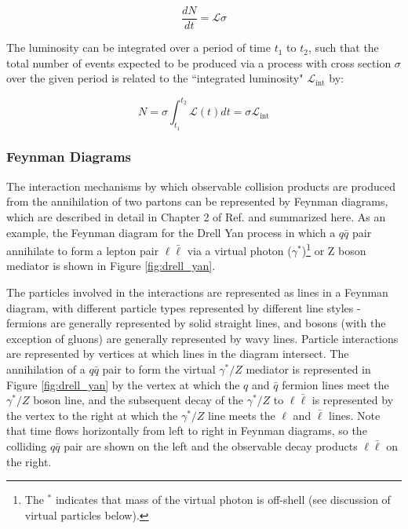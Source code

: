 \begin{equation}
\frac{dN}{dt} = \mathcal{L}\sigma
\end{equation}

The luminosity can be integrated over a period of time \(t_1\) to \(t_2\), such that the total number of events expected to be produced via a process with cross section \(\sigma\) over the given period is related to the ``integrated luminosity" \(\mathcal{L}_\text{int}\) by:

\begin{equation}
\label{eq:integrated_lumi}
N = \sigma\int_{t_1}^{t_2}\mathcal{L}(t)dt = \sigma\mathcal{L}_\text{int}
\end{equation}

\subsubsection{Feynman Diagrams}

The interaction mechanisms by which observable collision products are produced from the annihilation of two partons can be represented by Feynman diagrams, which are described in detail in Chapter 2 of Ref. \cite{griffiths_2008} and summarized here. As an example, the Feynman diagram for the Drell Yan process in which a \(q\bar{q}\) pair annihilate to form a lepton pair \(\ell\bar{\ell}\) via a virtual photon (\(\gamma^{*}\))\footnote{The \(^{*}\) indicates that mass of the virtual photon is off-shell (see discussion of virtual particles below).} or Z boson mediator is shown in Figure \ref{fig:drell_yan}. 

The particles involved in the interactions are represented as lines in a Feynman diagram, with different particle types represented by different line styles - fermions are generally represented by solid straight lines, and bosons (with the exception of gluons) are generally represented by wavy lines. Particle interactions are represented by vertices at which lines in the diagram intersect. The annihilation of a \(q\bar{q}\) pair to form the virtual \(\gamma^{*}/Z\) mediator is represented in Figure \ref{fig:drell_yan} by the vertex at which the \(q\) and \(\bar{q}\) fermion lines meet the \(\gamma^{*}/Z\) boson line, and the subsequent decay of the  \(\gamma^{*}/Z\) to \(\ell\bar{\ell}\) is represented by the vertex to the right at which the \(\gamma^{*}/Z\) line meets the \(\ell\) and \(\bar{\ell}\) lines. Note that time flows horizontally from left to right in Feynman diagrams, so the colliding \(q\bar{q}\) pair are shown on the left and the observable decay products \(\ell\bar{\ell}\) on the right.

